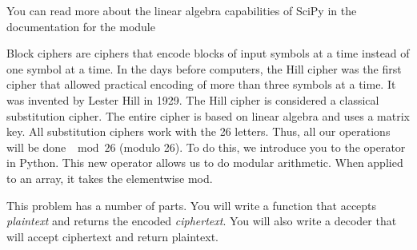 You can read more about the linear algebra capabilities of SciPy in the documentation for the  module

\begin{problem}
Block ciphers are ciphers that encode blocks of input symbols at a time instead of one symbol at a time.
In the days before computers, the Hill cipher was the first cipher that allowed practical encoding of more than three symbols at a time.
It was invented by Lester Hill in 1929.
The Hill cipher is considered a classical substitution cipher.
The entire cipher is based on linear algebra and uses a matrix key.
All substitution ciphers work with the 26 letters.
Thus, all our operations will be done $\mod{26}$ (modulo 26).
To do this, we introduce you to the \li{\%} operator in Python.
This new operator allows us to do modular arithmetic.
When applied to an array, it takes the elementwise mod.

This problem has a number of parts.  You will write a function that accepts \emph{plaintext} and returns the encoded \emph{ciphertext}.
You will also write a decoder that will accept ciphertext and return plaintext.


\end{problem}
